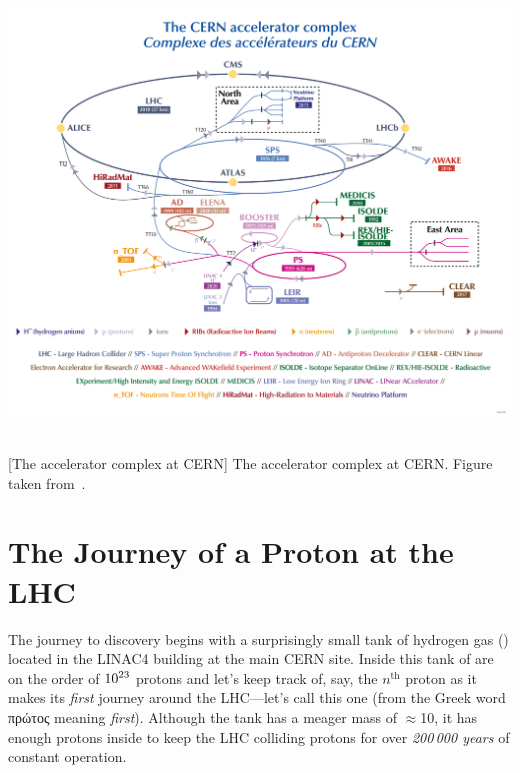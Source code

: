 \begin{multiFigure}
    \centering
        \includegraphics[height=12.5cm]{figures/lhc/cern_complex.png}
        [The accelerator complex at CERN]
        {The accelerator complex at CERN. Figure taken from~\cite{cern_complex}.}
    \label{fig:lhc_complex}
\end{multiFigure}

\section{The Journey of a Proton at the LHC}
The journey to discovery begins with a surprisingly small tank of hydrogen gas (\htwo) located in the LINAC4 building at the main CERN site.
Inside this tank of \htwo are on the order of $\text{10}^\text{23}$ protons and let's keep track of, say, the $n^\text{th}$ proton as it makes its \emph{first} journey around the LHC---let's call this one \pname (from the Greek word \textgreek{πρώτος} meaning \emph{first}).
Although the tank has a meager mass of 
$\approx$10\Kg,
it has enough protons inside to keep the LHC colliding protons for over \emph{200\,000 years} of constant operation.

